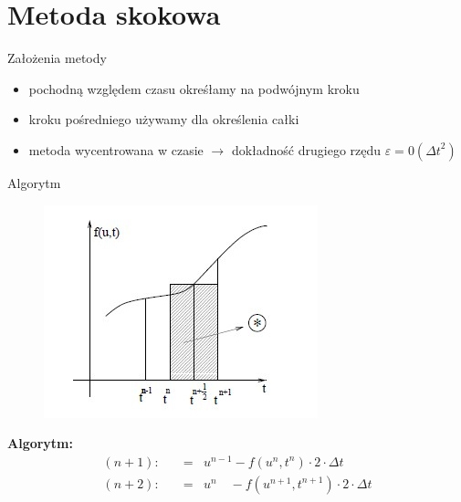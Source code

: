 \section{Metoda skokowa}
\begin{frame}{Założenia metody}
	\begin{itemize}
	\item pochodną względem czasu okreśłamy na podwójnym kroku
    \item kroku pośredniego używamy dla określenia całki
    \item metoda wycentrowana w czasie $\rightarrow $ dokładność drugiego rzędu $\varepsilon = 0({\Delta t}^2)$
	\end{itemize}
\end{frame}
\begin{frame}{Algorytm}
	\begin{figure}
	\includegraphics[height=0.5\textheight]{img/22/metoda_skokowa.jpg}
	\end{figure}
    \textbf{Algorytm:}
    $$ \begin{array}{rcl}
      (n+1):\quad &=&u^{n-1} -f(u^n,t^n)\cdot 2 \cdot \Delta t\\
      (n+2):\quad &=&u^n \quad -f(u^{n+1},t^{n+1})\cdot 2 \cdot \Delta t
      \end{array} $$
    
\end{frame}

